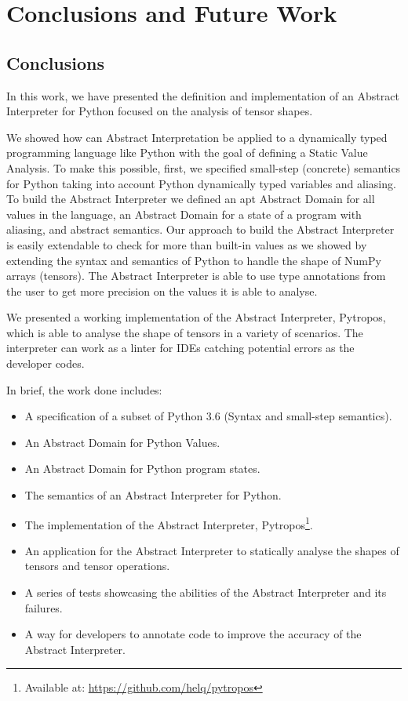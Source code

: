 \chapter{Conclusions and Future Work}\label{conclusions}

\section{Conclusions}

In this work, we have presented the definition and implementation of an Abstract
Interpreter for Python focused on the analysis of tensor shapes.

We showed how can Abstract Interpretation be applied to a dynamically typed programming
language like Python with the goal of defining a Static Value Analysis. To make this
possible, first, we specified small-step (concrete) semantics for Python taking into
account Python dynamically typed variables and aliasing. To build the Abstract Interpreter
we defined an apt Abstract Domain for all values in the language, an Abstract Domain for a
state of a program with aliasing, and abstract semantics. Our approach to build the
Abstract Interpreter is easily extendable to check for more than built-in values as we
showed by extending the syntax and semantics of Python to handle the shape of NumPy arrays
(tensors). The Abstract Interpreter is able to use type annotations from the user to get
more precision on the values it is able to analyse.

We presented a working implementation of the Abstract Interpreter, Pytropos, which is able
to analyse the shape of tensors in a variety of scenarios. The interpreter can work as a
linter for IDEs catching potential errors as the developer codes.

In brief, the work done includes:

\begin{itemize}
\tightlist
\item A specification of a subset of Python 3.6 (Syntax and small-step semantics).
\item An Abstract Domain for Python Values.
\item An Abstract Domain for Python program states.
\item The semantics of an Abstract Interpreter for Python.
\item The implementation of the Abstract Interpreter, Pytropos\footnote{Available at:
    \url{https://github.com/helq/pytropos}}.
\item An application for the Abstract Interpreter to statically analyse the shapes of
  tensors and tensor operations.
\item A series of tests showcasing the abilities of the Abstract Interpreter and its
  failures.
\item A way for developers to annotate code to improve the accuracy of the Abstract
  Interpreter.
\end{itemize}

